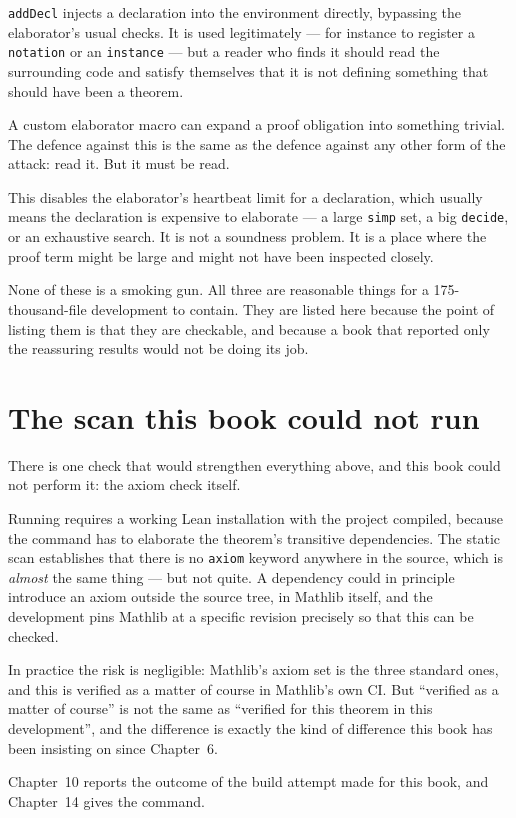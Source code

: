\begin{description}[style=nextline,leftmargin=0pt,labelwidth=0pt,labelsep=0pt,font=\sffamily\bfseries\small,
  itemsep=5pt]
\item[\texttt{addDecl}, one file.] \texttt{addDecl} injects a declaration into
the environment directly, bypassing the elaborator's usual checks. It is used
legitimately --- for instance to register a \texttt{notation} or an
\texttt{instance} --- but a reader who finds it should read the surrounding
code and satisfy themselves that it is not defining something that should have
been a theorem.
\item[Custom \texttt{macro}/\texttt{elab}/\texttt{syntax}, 22 files.] A
custom elaborator macro can expand a proof obligation into something trivial.
The defence against this is the same as the defence against any other form of
the attack: read it. But it must be read.
\item[\code{set\_option maxHeartbeats 0}, four files.] This disables the
elaborator's heartbeat limit for a declaration, which usually means the
declaration is expensive to elaborate --- a large \texttt{simp} set, a big
\texttt{decide}, or an exhaustive search. It is not a soundness problem. It is
a place where the proof term might be large and might not have been inspected
closely.
\end{description}

None of these is a smoking gun. All three are reasonable things for a
175-thousand-file development to contain. They are listed here because the
point of listing them is that they are checkable, and because a book that
reported only the reassuring results would not be doing its job.

\section{The scan this book could not run}There is one check that would strengthen everything above, and this book
could not perform it: the axiom check itself.

Running  requires a working Lean
installation with the project compiled, because the command has to elaborate
the theorem's transitive dependencies. The static scan establishes that
there is no \texttt{axiom} keyword anywhere in the source, which is
\emph{almost} the same thing --- but not quite. A dependency could in principle
introduce an axiom outside the source tree, in Mathlib itself, and the
development pins Mathlib at a specific revision precisely so that this can be
checked.

In practice the risk is negligible: Mathlib's axiom set is the three standard
ones, and this is verified as a matter of course in Mathlib's own CI. But
``verified as a matter of course'' is not the same as ``verified for this
theorem in this development'', and the difference is exactly the kind of
difference this book has been insisting on since Chapter~6.

Chapter~10 reports the outcome of the build attempt made for this book, and
Chapter~14 gives the command.

